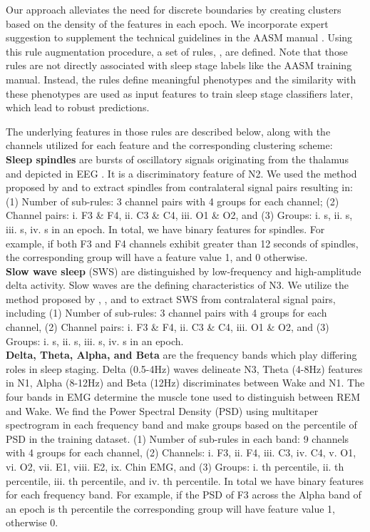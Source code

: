 \documentclass[pmlr]{jmlr}
\begin{document}
Our approach alleviates the need for discrete boundaries by creating clusters based on the density of the features in each epoch. We incorporate expert suggestion to supplement the technical guidelines in the AASM manual \citep{berry2012aasm}. Using this rule augmentation procedure, a set of  rules, , are defined. Note that those rules are not directly associated with sleep stage labels like the AASM training manual. Instead, the rules define meaningful phenotypes and the similarity with these phenotypes are used as input features to train sleep stage classifiers later, which lead to robust predictions.


The underlying features in those rules are described below, along with the channels utilized for each feature and the corresponding clustering scheme:\\

\noindent\textbf{Sleep spindles} are bursts of oscillatory signals originating from the thalamus and depicted in EEG \citep{spindle}. It is a discriminatory feature of N2. We used the method proposed by \citep{spindle_algo} and \citep{yasa} to extract spindles from contralateral signal pairs resulting in: 
(1) Number of sub-rules: 3 channel pairs with 4 groups for each channel; (2) Channel pairs: i. F3 \& F4, ii. C3 \& C4, iii. O1 \& O2, and (3) Groups: i. s, ii. s, iii. s, iv. s in an epoch. In total, we have  binary features for spindles. For example, if both F3 and F4 channels exhibit greater than 12 seconds of spindles, the corresponding group will have a feature value 1, and 0 otherwise. 
\\

\noindent\textbf{Slow wave sleep} (SWS) are distinguished by low-frequency and high-amplitude delta activity. Slow waves are the defining characteristics of N3. We utilize the method proposed by \citep{sws_algo1}, \citep{sws_algo2}, and \citep{yasa} to extract SWS from contralateral signal pairs, including (1) Number of sub-rules: 3 channel pairs with 4 groups for each channel, (2) Channel pairs: i. F3 \& F4, ii. C3 \& C4, iii. O1 \& O2, and (3) Groups: i.  s, ii. s, iii. s, iv. s in an epoch.\\

\noindent\textbf{Delta, Theta, Alpha, and Beta} are the frequency bands which play differing roles in sleep staging. Delta (0.5-4Hz) waves delineate N3, Theta (4-8Hz) features in N1, Alpha (8-12Hz) and Beta (12Hz) discriminates between Wake and N1. The four bands in EMG determine the muscle tone used to distinguish between REM and Wake. We find the Power Spectral Density (PSD) using multitaper spectrogram \citep{mne1, mne2} in each frequency band and make groups based on the percentile of PSD in the training dataset. (1) Number of sub-rules in each band: 9 channels with 4 groups for each channel, (2) Channels: i. F3, ii. F4, iii. C3, iv. C4, v. O1, vi. O2, vii. E1, viii. E2, ix. Chin EMG, and (3) Groups: i. th percentile, ii. th percentile, iii. th percentile, and iv. th percentile. In total we have  binary features for each frequency band. For example, if the PSD of F3 across the Alpha band of an epoch is  th percentile the corresponding group will have feature value 1, otherwise 0.\\
\end{document}

